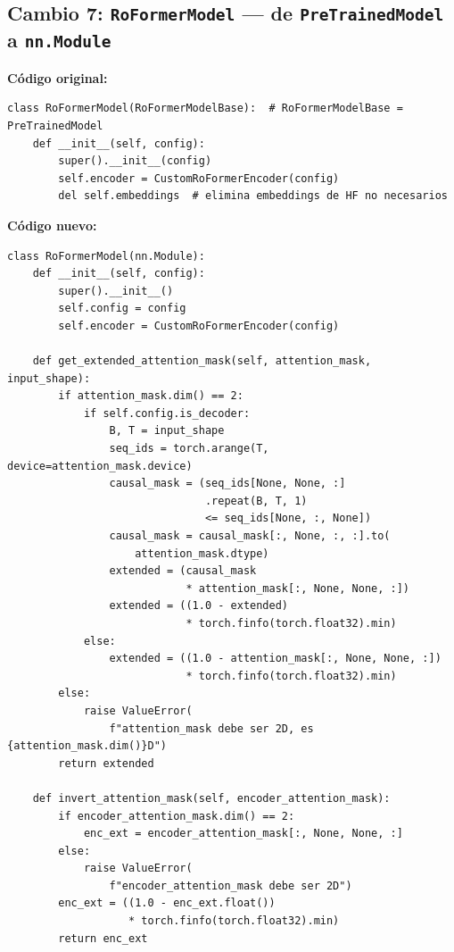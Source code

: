 \documentclass[12pt,a4paper]{article}
\begin{document}
\subsection{Cambio 7: \texttt{RoFormerModel} --- de \texttt{PreTrainedModel} a \texttt{nn.Module}}

\textbf{Código original:}
\begin{lstlisting}[caption={RoFormerModel original (hereda de PreTrainedModel de HF)}]
class RoFormerModel(RoFormerModelBase):  # RoFormerModelBase = PreTrainedModel
    def __init__(self, config):
        super().__init__(config)
        self.encoder = CustomRoFormerEncoder(config)
        del self.embeddings  # elimina embeddings de HF no necesarios
\end{lstlisting}

\textbf{Código nuevo:}
\begin{lstlisting}[caption={RoFormerModel corregida con metodos propios}]
class RoFormerModel(nn.Module):
    def __init__(self, config):
        super().__init__()
        self.config = config
        self.encoder = CustomRoFormerEncoder(config)

    def get_extended_attention_mask(self, attention_mask, input_shape):
        if attention_mask.dim() == 2:
            if self.config.is_decoder:
                B, T = input_shape
                seq_ids = torch.arange(T, device=attention_mask.device)
                causal_mask = (seq_ids[None, None, :]
                               .repeat(B, T, 1)
                               <= seq_ids[None, :, None])
                causal_mask = causal_mask[:, None, :, :].to(
                    attention_mask.dtype)
                extended = (causal_mask
                            * attention_mask[:, None, None, :])
                extended = ((1.0 - extended)
                            * torch.finfo(torch.float32).min)
            else:
                extended = ((1.0 - attention_mask[:, None, None, :])
                            * torch.finfo(torch.float32).min)
        else:
            raise ValueError(
                f"attention_mask debe ser 2D, es {attention_mask.dim()}D")
        return extended

    def invert_attention_mask(self, encoder_attention_mask):
        if encoder_attention_mask.dim() == 2:
            enc_ext = encoder_attention_mask[:, None, None, :]
        else:
            raise ValueError(
                f"encoder_attention_mask debe ser 2D")
        enc_ext = ((1.0 - enc_ext.float())
                   * torch.finfo(torch.float32).min)
        return enc_ext
\end{lstlisting}
\end{document}
